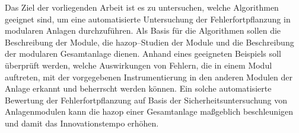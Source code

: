 Das Ziel der vorliegenden Arbeit ist es zu untersuchen, welche Algorithmen geeignet sind, um eine automatisierte Untersuchung der Fehlerfortpflanzung in modularen Anlagen durchzuf\"uhren. Als Basis f\"ur die Algorithmen sollen die Beschreibung der Module, die \ac{hazop}--Studien der Module und die Beschreibung der modularen Gesamtanlage dienen. \newline
Anhand eines geeigneten Beispiels soll \"uberpr\"uft werden, welche Auswirkungen von Fehlern, die in einem Modul auftreten, mit der vorgegebenen Instrumentierung in den anderen Modulen der Anlage erkannt und beherrscht werden k\"onnen. \newline
Ein solche automatisierte Bewertung der Fehlerfortpflanzung auf Basis der Sicherheitsuntersuchung von Anlagenmodulen kann die \ac{hazop} einer Gesamtanlage ma\ss{}geblich beschleunigen und damit das Innovationstempo erh\"ohen.